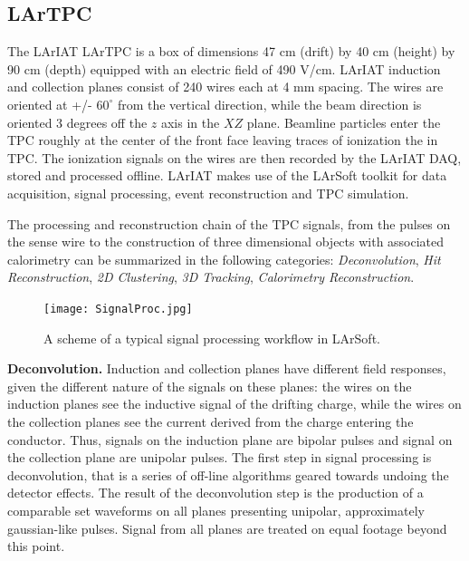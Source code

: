\documentclass[aps,prl,twocolumn,showpacs,superscriptaddress,groupedaddress]{revtex4}  %
\begin{document}
\subsection{\label{sec:LArTPC}LArTPC}

The LArIAT LArTPC is a box of dimensions 47 cm (drift) by 40 cm (height) by 90 cm (depth) equipped with an  electric field of 490 V/cm. LArIAT induction and collection planes consist of 240 wires each at 4 mm spacing. The wires are oriented at +/- $60^{\circ}$ from the vertical direction, while the beam direction is oriented 3 degrees off the $z$ axis in the $XZ$ plane.   Beamline particles enter the TPC roughly at the center of the front face leaving traces of ionization the in TPC. The ionization signals on the wires are then recorded by the LArIAT DAQ, stored and processed offline. LArIAT makes use of the LArSoft toolkit \cite{EricFChurck} for data acquisition, signal processing, event reconstruction and TPC simulation. 

The processing and reconstruction chain of the TPC signals, from the pulses on the sense wire to the construction of three dimensional objects with associated calorimetry can be summarized in the following categories: \emph{Deconvolution}, \emph{Hit Reconstruction}, \emph{2D Clustering}, \emph{3D Tracking}, \emph{Calorimetry Reconstruction}. \\ %

\begin{figure}[hbpt]
\centering
\texttt{[image: SignalProc.jpg]}
\caption{A scheme of a typical signal processing workflow in LArSoft.}
\label{fig:SignalProc}
\end{figure}

\textbf{Deconvolution.} Induction and collection planes have different field responses, given the different nature of the signals on these planes: the wires on the induction planes see the inductive signal of the drifting charge, while the wires on the collection planes see the current derived from the charge entering the conductor. Thus, signals on the induction plane are bipolar pulses and signal on the collection plane are unipolar pulses. %
The first step in signal processing is deconvolution, that is a series of off-line algorithms geared towards undoing the detector effects. The result of the deconvolution step is  the production of  a comparable set waveforms on all planes presenting unipolar, approximately gaussian-like pulses. %
Signal from all planes are treated on equal footage beyond this point.\\
\end{document}
